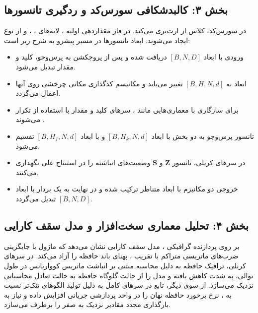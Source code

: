 \subsection*{بخش ۳: کالبدشکافی سورس‌کد و ردگیری تانسورها }
در سورس‌کد، کلاس  از  ارث‌بری می‌کند. در فاز مقداردهی اولیه ، لایه‌های ، ،  و  از نوع  ایجاد می‌شوند. ابعاد تانسورها در مسیر پیشرو  به شرح زیر است:
\begin{itemize}
    \item ورودی با ابعاد $[B, N, D]$ دریافت شده و پس از پروجکشن به پرس‌وجو، کلید و مقدار تبدیل می‌شود.
    \item ابعاد به $[B, H, N, d]$ تغییر می‌یابد و مکانیسم کدگذاری مکانی چرخشی  روی آنها اعمال می‌گردد.
    \item برای سازگاری با معماری‌هایی مانند ، سرهای کلید و مقدار با استفاده از  تکرار می‌شوند .
    \item تانسور پرس‌وجو به دو بخش  با ابعاد $[B, H_k, N, d]$ و  با ابعاد $[B, H_f, N, d]$ تقسیم می‌شود.
    \item در سرهای کرنلی، تانسور $\mathbf{Z}$ و $\mathbf{S}$ وضعیت‌های انباشته را در استنتاج علی  نگهداری می‌کنند.
    \item خروجی دو مکانیزم با ابعاد متناظر ترکیب  شده و در نهایت به یک بردار با ابعاد $[B, N, D]$ تبدیل می‌گردد.
\end{itemize}

\subsection*{بخش ۴: تحلیل معماری سخت‌افزار و مدل سقف کارایی }
بر روی پردازنده گرافیکی ، مدل سقف کارایی نشان می‌دهد که ماژول  با جایگزینی ضرب‌های ماتریسی متراکم با تقریب ، پهنای باند حافظه  را آزاد می‌کند. 
در سرهای کرنلی، ترافیک حافظه به دلیل محاسبه مبتنی بر انباشت ماتریس کوواریانس در طول توالی، به شدت کاهش یافته و مدل را از حالت گلوگاه حافظه  به حالت تعادل محاسباتی نزدیک می‌سازد. از سوی دیگر، تابع  در سرهای کامل به دلیل تولید الگوهای تنک‌تر نسبت به ، نرخ برخورد حافظه نهان  را در واحد پردازشی جریانی افزایش داده و نیاز به بارگذاری مجدد مقادیر نزدیک به صفر را برطرف می‌سازد.

